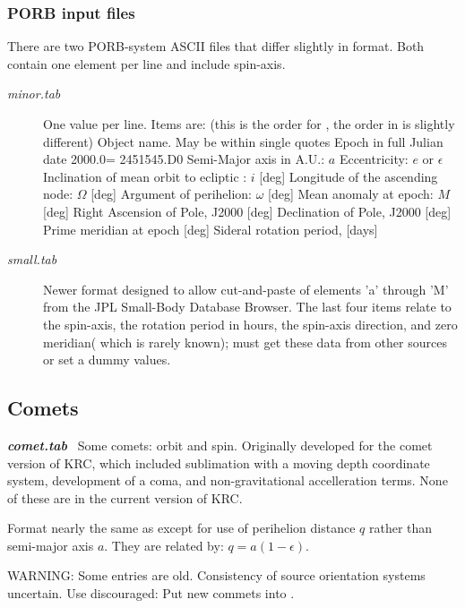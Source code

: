 \documentclass[draft]{article}
\begin{document}
\subsubsection{PORB input files} %
There are two PORB-system ASCII files that differ slightly in format. Both
contain one element per line and include spin-axis.

\begin{description} 
 \item [\textit{minor.tab}] One value per line. Items are: 
\qii (this is the order for , the order in  is slightly different)
 \qi Object name. May be within single quotes
 \qi Epoch in full Julian date     2000.0= 2451545.D0 
 \qi Semi-Major axis in A.U.: $a$
 \qi Eccentricity: $e$ or $\epsilon$
 \qi Inclination of mean orbit to ecliptic : $i$ [deg]
 \qi Longitude of the ascending node: $\Omega $ [deg]
 \qi Argument of perihelion: $\omega$ [deg]
 \qi Mean anomaly at epoch: $M$ [deg]
 \qi Right Ascension of Pole, J2000 [deg]
 \qi Declination of Pole, J2000 [deg]
 \qi Prime meridian at epoch [deg]
 \qi Sideral rotation period, [days]

 \item [\textit{small.tab}] Newer format designed to allow cut-and-paste of
   elements 'a' through 'M' from the JPL Small-Body Database Browser.  The last
   four items relate to the spin-axis, the rotation period in hours, the
   spin-axis direction, and zero meridian( which is rarely known); must get
   these data from other sources or set a dummy values.
 \end{description}

\subsection{Comets}

\textbf{\textit{comet.tab}} \  Some comets: orbit and spin. 
Originally developed for the comet version of KRC, which included sublimation with a moving depth coordinate system, development of a coma, and non-gravitational accelleration terms. None of these are in the current version of KRC.

Format nearly the same as  except for use of perihelion distance $q$ rather than semi-major axis $a$. They are related by: $q=a(1- \epsilon)$.

WARNING: Some entries are old. Consistency of source orientation systems uncertain. Use discouraged: Put new commets into . 
\end{document}
